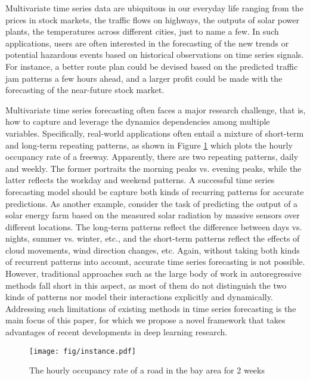 \documentclass[sigconf]{acmart}
\begin{document}
Multivariate time series data are ubiquitous in our everyday life ranging from the prices in stock markets, the traffic flows on highways, the outputs of solar power plants, the temperatures across different cities, just to name a few. In such applications, users are often interested in the forecasting of the new trends or potential hazardous events based on historical observations on time series signals. For instance, a better route plan could be devised based on the predicted traffic jam patterns a few hours ahead, and a larger profit could be made with the forecasting of the near-future stock market. 

Multivariate time series forecasting often faces a major research challenge, that is, how to capture and leverage the dynamics dependencies among multiple variables.  Specifically,  
real-world applications often entail a mixture of short-term and long-term repeating patterns, as shown in Figure \ref{fig:tra-ex} which plots the hourly occupancy rate of a freeway.
Apparently, there are two repeating patterns, daily and weekly. The former portraits the morning peaks vs. evening peaks, while the latter reflects the workday and weekend patterns. A successful time series forecasting model should be capture both kinds of recurring patterns for accurate predictions. As another example, consider the task of predicting the output of a solar energy farm based on the measured solar radiation by massive sensors over different locations.  The long-term patterns reflect the difference between days vs. nights, summer vs. winter, etc., and the short-term patterns reflect the effects of cloud movements, wind direction changes, etc.  Again, without taking both kinds of recurrent patterns into account, accurate time series forecasting is not possible.  However, traditional approaches such as the large body of work in autoregressive methods \cite{hamilton1994time, box2015time,zhang2003time,Yu_NIPS_16,li2014forecasting} fall short in this aspect, as most of them do not distinguish the two kinds of patterns nor model their interactions explicitly and dynamically. Addressing such limitations of existing methods in time series forecasting is the main focus of this paper, for which we propose a novel framework that takes advantages of recent developments in deep learning research.


    \begin{figure}[!t]
    	\centering
        \texttt{[image: fig/instance.pdf]}
        \caption{The hourly occupancy rate of a road in the bay area for 2 weeks}
        \label{fig:tra-ex}
    \end{figure}
    
\end{document}
